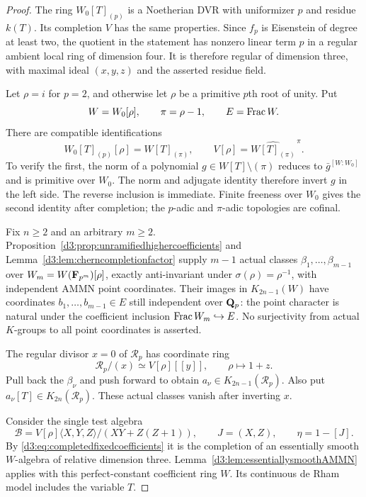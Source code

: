 \begin{proof}
The ring $W_0[T]_{(p)}$ is a Noetherian DVR with uniformizer
$p$ and residue $k(T)$. Its completion $V$ has the same
properties. Since $f_p$ is Eisenstein of degree at least two,
the quotient in the statement has nonzero linear term $p$
in a regular ambient local ring of dimension four.
It is therefore regular of dimension three, with maximal
ideal $(x,y,z)$ and the asserted residue field.

Let $\rho=i$ for $p=2$, and otherwise let $\rho$ be a primitive
$p$th root of unity. Put
\[
 W=W_0[\rho],\qquad \pi=\rho-1,\qquad E=\operatorname{Frac} W.
\]
There are compatible identifications
\begin{equation}\label{d3:eq:completedfixedcoefficients}
 W_0[T]_{(p)}[\rho]=W[T]_{(\pi)},\qquad
 V[\rho]=\widehat{W[T]_{(\pi)}}^{\,\pi}.
\end{equation}
To verify the first, the norm of a polynomial
$g\in W[T]\setminus(\pi)$ reduces to $\bar g^{[W:W_0]}$
and is primitive over $W_0$. The norm and adjugate identity
therefore invert $g$ in the left side. The reverse inclusion
is immediate. Finite freeness over $W_0$ gives the second
identity after completion; the $p$-adic and $\pi$-adic
topologies are cofinal.

Fix $n\geq2$ and an arbitrary $m\geq2$.
Proposition~\ref{d3:prop:unramifiedhighercoefficients} and
Lemma~\ref{d3:lem:cherncompletionfactor} supply $m-1$ actual
classes $\beta_1,\ldots,\beta_{m-1}$ over
$W_m=W(\mathbf F_{p^m})[\rho]$, exactly anti-invariant under
$\sigma(\rho)=\rho^{-1}$, with independent AMMN point
coordinates. Their images in $K_{2n-1}(W)$ have coordinates
$b_1,\ldots,b_{m-1}\in E$ still independent over $\mathbf Q_p$:
the point character is natural under the coefficient inclusion
$\operatorname{Frac} W_m\hookrightarrow E$.
No surjectivity from actual $K$-groups to all point coordinates
is asserted.

The regular divisor $x=0$ of $\mathcal R_p$ has coordinate ring
\[
 \mathcal R_p/(x)\simeq V[\rho][[y]],
 \qquad \rho\longmapsto1+z.
\]
Pull back the $\beta_\nu$ and push forward to obtain
$a_\nu\in K_{2n-1}(\mathcal R_p)$.
Also put $a_\nu[T]\in K_{2n}(\mathcal R_p)$.
These actual classes vanish after inverting $x$.

Consider the single test algebra
\[
 \mathcal B=V[\rho]\langle X,Y,Z\rangle/(XY+Z(Z+1)),
 \qquad J=(X,Z),\qquad\eta=1-[J].
\]
By \eqref{d3:eq:completedfixedcoefficients} it is the completion
of an essentially smooth $W$-algebra of relative dimension
three. Lemma~\ref{d3:lem:essentiallysmoothAMMN} applies with
this perfect-constant coefficient ring $W$.
Its continuous de Rham model includes the variable $T$.


\end{proof}
